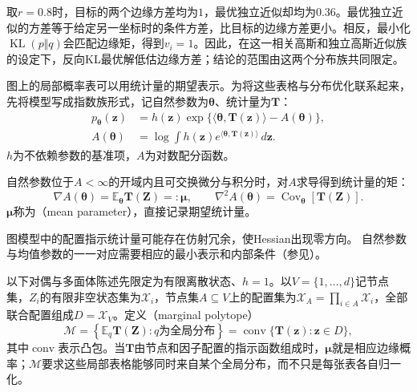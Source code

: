 取$r=0.8$时，目标的两个边缘方差均为$1$，最优独立近似却均为$0.36$。最优独立近似的方差等于给定另一坐标时的条件方差，比目标的边缘方差更小。相反，最小化$\operatorname{KL}(p\Vert q)$会匹配边缘矩，得到$v_i=1$。因此，在这一相关高斯和独立高斯近似族的设定下，反向KL最优解低估边缘方差；结论的范围由这两个分布族共同限定。

图上的局部概率表可以用统计量的期望表示。为将这些表格与分布优化联系起来，先将模型写成指数族形式，记自然参数为$\bm\theta$、统计量为$\bm T$：
\begin{equation}
  \begin{aligned}
    p_{\bm{\theta}}(\bm{z})
      &=h(\bm{z})\exp\{\langle\bm{\theta},\bm{T}(\bm{z})\rangle
                      -A(\bm{\theta})\},\\
    A(\bm{\theta})
      &=\log\int h(\bm{z})
          e^{\langle\bm{\theta},\bm{T}(\bm{z})\rangle}\,d\bm{z}.
  \end{aligned}
  \label{eq:pgm-variational-exponential-family}
\end{equation}
$h$为不依赖参数的基准项，$A$为对数配分函数。

自然参数位于$A<\infty$的开域内且可交换微分与积分时，对$A$求导得到统计量的矩：
\begin{equation}
  \nabla A(\bm{\theta})=\mathbb E_{\bm{\theta}}\bm{T}(\bm{Z})
      =:\bm{\mu},\qquad
  \nabla^2 A(\bm{\theta})
      =\operatorname{Cov}_{\bm{\theta}}[\bm{T}(\bm{Z})].
  \label{eq:pgm-variational-moments}
\end{equation}
$\bm{\mu}$称为（mean parameter），直接记录期望统计量。

图模型中的配置指示统计量可能存在仿射冗余，使Hessian出现零方向。
自然参数与均值参数的一一对应需要相应的最小表示和内部条件（参见）。

以下对偶与多面体陈述先限定为有限离散状态、$h=1$。以$V=\{1,\ldots,d\}$记节点集，$Z_i$的有限非空状态集为$\mathcal X_i$，节点集$A\subseteq V$上的配置集为$\mathcal X_A=\prod_{i\in A}\mathcal X_i$，全部联合配置组成$D=\mathcal X_V$。定义（marginal polytope）
\begin{equation}
  \mathcal M
    =\left\{\mathbb E_q\bm{T}(\bm{Z}):q\text{为全局分布}\right\}
    =\operatorname{conv}\{\bm{T}(\bm{z}):\bm{z}\in D\},
  \label{eq:pgm-variational-marginal-polytope}
\end{equation}
其中$\operatorname{conv}$表示凸包。当$\bm{T}$由节点和因子配置的指示函数组成时，$\bm{\mu}$就是相应边缘概率；$\mathcal M$要求这些局部表格能够同时来自某个全局分布，而不只是每张表各自归一化。

